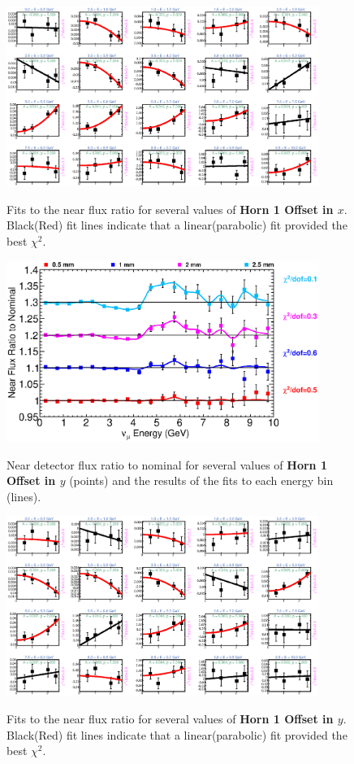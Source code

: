 \begin{figure}[hb]
  \begin{center}
    {\includegraphics[width=4.0in]{figures/Horn1XOffset_near_fits.eps}}
  \end{center}
\caption{ Fits to the near flux ratio for several values of {\bf Horn 1 Offset in $x$}. Black(Red) fit lines indicate that a linear(parabolic) fit provided the best $\chi^2$. }
\end{figure}

\begin{figure}[ht]
  \begin{center}
    {\includegraphics[width=4.0in]{figures/Horn1YOffset_near_summary.eps}}
  \end{center}
\caption{ Near detector flux ratio to nominal for several values of {\bf Horn 1 Offset in $y$} (points) and the results of the fits to each energy bin (lines).}
\end{figure}

\begin{figure}[hb]
  \begin{center}
    {\includegraphics[width=4.0in]{figures/Horn1YOffset_near_fits.eps}}
  \end{center}
\caption{ Fits to the near flux ratio for several values of {\bf Horn 1 Offset in $y$}. Black(Red) fit lines indicate that a linear(parabolic) fit provided the best $\chi^2$. }
\end{figure}

